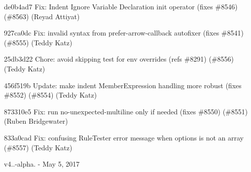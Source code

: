 \begin{DoxyItemize}
\item de0b4ad7 Fix\+: Indent Ignore Variable Declaration init operator (fixes \#8546) (\#8563) (Reyad Attiyat)
\item 927ca0dc Fix\+: invalid syntax from prefer-\/arrow-\/callback autofixer (fixes \#8541) (\#8555) (Teddy Katz)
\item 25db3d22 Chore\+: avoid skipping test for env overrides (refs \#8291) (\#8556) (Teddy Katz)
\item 456f519b Update\+: make indent Member\+Expression handling more robust (fixes \#8552) (\#8554) (Teddy Katz)
\item 873310e5 Fix\+: run no-\/unexpected-\/multiline only if needed (fixes \#8550) (\#8551) (Ruben Bridgewater)
\item 833a0cad Fix\+: confusing Rule\+Tester error message when options is not an array (\#8557) (Teddy Katz)
\end{DoxyItemize}

v4..-\/alpha. -\/ May 5, 2017



